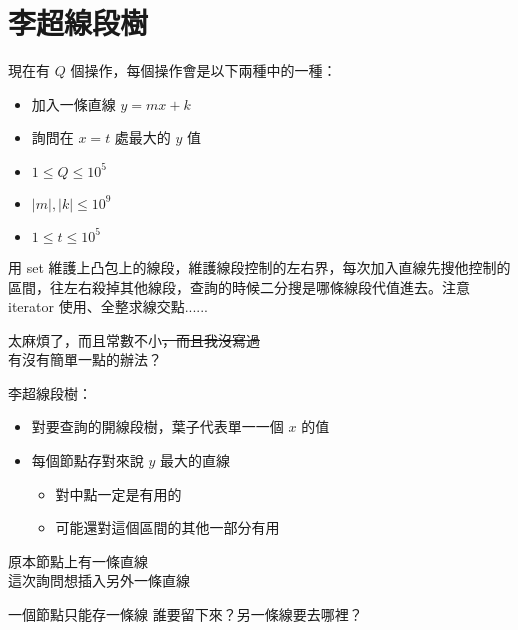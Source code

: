 \section{李超線段樹}

\begin{frame}{\ebtitle}
    \begin{problem}[動態凸包]
        現在有 $Q$ 個操作，每個操作會是以下兩種中的一種：

        \begin{itemize}
            \item 加入一條直線 $y = mx + k$
            \item 詢問在 $x = t$ 處最大的 $y$ 值
        \end{itemize}

        \begin{itemize}
            \item $1\le Q \le 10^5$
            \item $|m|, |k| \le 10^9$
            \item $1 \le t \le 10^5$
        \end{itemize}
    \end{problem}
\end{frame}

\begin{frame}{\ebtitle}
    用 set 維護上凸包上的線段，維護線段控制的左右界，每次加入直線先搜他控制的區間，往左右殺掉其他線段，查詢的時候二分搜是哪條線段代值進去。注意 iterator 使用、全整求線交點......

    太麻煩了，而且常數不小\sout{，而且我沒寫過} \\
    有沒有簡單一點的辦法？
\end{frame}

\begin{frame}{\ebtitle}
    李超線段樹：
    \begin{itemize}
        \item 對要查詢的開線段樹，葉子代表單一一個 $x$ 的值
        \item 每個節點存對來說 $y$ 最大的直線
        \begin{itemize}
            \item 對中點一定是有用的
            \item 可能還對這個區間的其他一部分有用
        \end{itemize}
    \end{itemize}
\end{frame}

\begin{frame}{}
    原本節點上有一條直線 \\
    這次詢問想插入另外一條直線

    一個節點只能存一條線
    誰要留下來？另一條線要去哪裡？
\end{frame}

